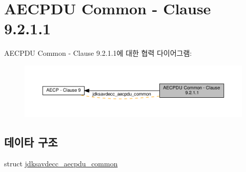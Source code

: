 \hypertarget{group__aecpdu__common}{}\section{A\+E\+C\+P\+DU Common -\/ Clause 9.2.1.1}
\label{group__aecpdu__common}
A\+E\+C\+P\+DU Common -\/ Clause 9.2.1.1에 대한 협력 다이어그램\+:
\nopagebreak
\begin{figure}[H]
\begin{center}
\leavevmode
\includegraphics[width=350pt]{group__aecpdu__common}
\end{center}
\end{figure}
\subsection*{데이타 구조}
\begin{DoxyCompactItemize}
\item 
struct \hyperlink{structjdksavdecc__aecpdu__common}{jdksavdecc\+\_\+aecpdu\+\_\+common}
\end{DoxyCompactItemize}
